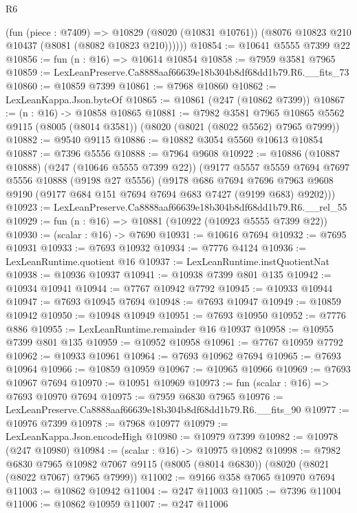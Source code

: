 \begin{lexlean}{R6}
\begin{coremodule}
        (fun (piece : @7409) =>
        @10829 (@8020 (@10831 @10761)) (@8076 @10823 @210 @10437 (@8081 (@8082 @10823 @210))))))
@10854 := @10641 @5555 @7399 @22
@10856 := fun (n : @16) => @10614 @10854
@10858 := @7959 @3581 @7965
@10859 := LexLeanPreserve.Ca8888aaf66639e18b304b8df68dd1b79.R6.__fits_73
@10860 := @10859 @7399
@10861 := @7968 @10860
@10862 := LexLeanKappa.Json.byteOf
@10865 := @10861 (@247 (@10862 @7399))
@10867 := (n : @16) -> @10858 @10865
@10881 := @7982
    @3581
    @7965
    @10865
    @5562
    @9115
    (@8005 (@8014 @3581))
    (@8020 (@8021 (@8022 @5562) @7965 @7999))
@10882 := @9540 @9115
@10886 := @10882 @3054 @5560 @10613 @10854
@10887 := @7396 @5556
@10888 := @7964 @9608
@10922 := @10886
    (@10887 @10888)
    (@247 (@10646 @5555 @7399 @22))
    (@9177
      @5557
      @5559
      @7694
      @7697
      @5556
      @10888
      (@9198 @27 @5556)
      (@9178
        @686
        @7694
        @7696
        @7963
        @9608
        @9190
        (@9177 @684 @151 @7694 @7694 @683 @7427 (@9199 @683) @9202)))
@10923 := LexLeanPreserve.Ca8888aaf66639e18b304b8df68dd1b79.R6.__rel_55
@10929 := fun (n : @16) => @10881 (@10922 (@10923 @5555 @7399 @22))
@10930 := (scalar : @16) -> @7690
@10931 := @10616 @7694
@10932 := @7695 @10931
@10933 := @7693 @10932
@10934 := @7776 @4124
@10936 := LexLeanRuntime.quotient @16
@10937 := LexLeanRuntime.instQuotientNat
@10938 := @10936 @10937
@10941 := @10938 @7399 @801 @135
@10942 := @10934 @10941
@10944 := @7767 @10942 @7792
@10945 := @10933 @10944
@10947 := @7693 @10945 @7694
@10948 := @7693 @10947
@10949 := @10859 @10942
@10950 := @10948 @10949
@10951 := @7693 @10950
@10952 := @7776 @886
@10955 := LexLeanRuntime.remainder @16 @10937
@10958 := @10955 @7399 @801 @135
@10959 := @10952 @10958
@10961 := @7767 @10959 @7792
@10962 := @10933 @10961
@10964 := @7693 @10962 @7694
@10965 := @7693 @10964
@10966 := @10859 @10959
@10967 := @10965 @10966
@10969 := @7693 @10967 @7694
@10970 := @10951 @10969
@10973 := fun (scalar : @16) => @7693 @10970 @7694
@10975 := @7959 @6830 @7965
@10976 := LexLeanPreserve.Ca8888aaf66639e18b304b8df68dd1b79.R6.__fits_90
@10977 := @10976 @7399
@10978 := @7968 @10977
@10979 := LexLeanKappa.Json.encodeHigh
@10980 := @10979 @7399
@10982 := @10978 (@247 @10980)
@10984 := (scalar : @16) -> @10975 @10982
@10998 := @7982
    @6830
    @7965
    @10982
    @7067
    @9115
    (@8005 (@8014 @6830))
    (@8020 (@8021 (@8022 @7067) @7965 @7999))
@11002 := @9166 @358 @7065 @10970 @7694
@11003 := @10862 @10942
@11004 := @247 @11003
@11005 := @7396 @11004
@11006 := @10862 @10959
@11007 := @247 @11006

\end{coremodule}
\end{lexlean}
